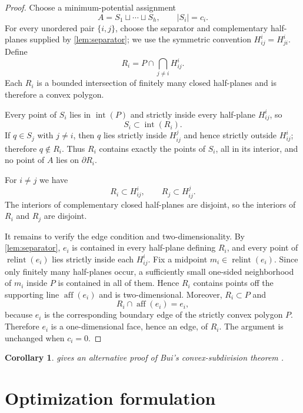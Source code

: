 \documentclass[final,5p,times,twocolumn]{elsarticle}
\newtheorem{corollary}[corollary]{Corollary}
\theoremstyle{definition}
\theoremstyle{remark}
\newcommand{\interior}[1]{\operatorname{int}(#1)}
\newcommand{\relint}{\operatorname{relint}}
\newcommand{\aff}{\operatorname{aff}}
\begin{document}
\begin{proof}
Choose a minimum-potential assignment
\[
A=S_1\sqcup\cdots\sqcup S_h,
\qquad |S_i|=c_i.
\]
For every unordered pair $\{i,j\}$, choose the separator and complementary half-planes supplied by \cref{lem:separator}; we use the symmetric convention $H_{ij}^{i}=H_{ji}^{i}$. Define
\begin{equation}
R_i=P\cap\bigcap_{j\neq i}H_{ij}^{i}.
\label{eq:regions}
\end{equation}
Each $R_i$ is a bounded intersection of finitely many closed half-planes and is therefore a convex polygon.

Every point of $S_i$ lies in $\interior P$ and strictly inside every half-plane $H_{ij}^{i}$, so
\[
S_i\subset\interior{R_i}.
\]
If $q\in S_j$ with $j\neq i$, then $q$ lies strictly inside $H_{ij}^{j}$ and hence strictly outside $H_{ij}^{i}$; therefore $q\notin R_i$. Thus $R_i$ contains exactly the points of $S_i$, all in its interior, and no point of $A$ lies on $\partial R_i$.

For $i\neq j$ we have
\[
R_i\subset H_{ij}^{i},
\qquad
R_j\subset H_{ij}^{j}.
\]
The interiors of complementary closed half-planes are disjoint, so the interiors of $R_i$ and $R_j$ are disjoint.

It remains to verify the edge condition and two-dimensionality. By \cref{lem:separator}, $e_i$ is contained in every half-plane defining $R_i$, and every point of $\relint(e_i)$ lies strictly inside each $H_{ij}^{i}$. Fix a midpoint $m_i\in\relint(e_i)$. Since only finitely many half-planes occur, a sufficiently small one-sided neighborhood of $m_i$ inside $P$ is contained in all of them. Hence $R_i$ contains points off the supporting line $\aff(e_i)$ and is two-dimensional. Moreover, $R_i\subset P$ and
\[
R_i\cap\aff(e_i)=e_i,
\]
because $e_i$ is the corresponding boundary edge of the strictly convex polygon $P$. Therefore $e_i$ is a one-dimensional face, hence an edge, of $R_i$. The argument is unchanged when $c_i=0$.
\end{proof}

\begin{corollary}
\label{cor:bui-subdivision}
 gives an alternative proof of Bui's convex-subdivision theorem \cite[Theorem~4.1]{Bui2025}.
\end{corollary}

\balance
\section{Optimization formulation}
\label{sec:algorithm}
\end{document}
